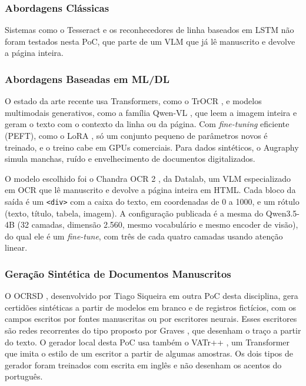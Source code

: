 \subsubsection{Abordagens Clássicas}
Sistemas como o Tesseract e os reconhecedores de linha baseados em LSTM não foram testados nesta PoC, que parte de um VLM que já lê manuscrito e devolve a página inteira.

\subsubsection{Abordagens Baseadas em ML/DL}
O estado da arte recente usa Transformers, como o TrOCR \cite{trocr2021}, e modelos multimodais generativos, como a família Qwen-VL \cite{qwen2vl}, que leem a imagem inteira e geram o texto com o contexto da linha ou da página. Com \emph{fine-tuning} eficiente (PEFT), como o LoRA \cite{lora2022, peft2022}, só um conjunto pequeno de parâmetros novos é treinado, e o treino cabe em GPUs comerciais. Para dados sintéticos, o Augraphy \cite{augraphy2022} simula manchas, ruído e envelhecimento de documentos digitalizados.

O modelo escolhido foi o Chandra OCR 2 \cite{chandra2026}, da Datalab, um VLM especializado em OCR que lê manuscrito e devolve a página inteira em HTML. Cada bloco da saída é um \texttt{<div>} com a caixa do texto, em coordenadas de 0 a 1000, e um rótulo (texto, título, tabela, imagem). A configuração publicada é a mesma do Qwen3.5-4B \cite{qwen35} (32 camadas, dimensão 2.560, mesmo vocabulário e mesmo encoder de visão), do qual ele é um \emph{fine-tune}, com três de cada quatro camadas usando atenção linear.

\subsubsection{Geração Sintética de Documentos Manuscritos}
O OCRSD \cite{ocrsd}, desenvolvido por Tiago Siqueira em outra PoC desta disciplina, gera certidões sintéticas a partir de modelos em branco e de registros fictícios, com os campos escritos por fontes manuscritas ou por escritores neurais. Esses escritores são redes recorrentes do tipo proposto por Graves \cite{graves2013}, que desenham o traço a partir do texto. O gerador local desta PoC usa também o VATr++ \cite{vatrpp2024}, um Transformer que imita o estilo de um escritor a partir de algumas amostras. Os dois tipos de gerador foram treinados com escrita em inglês e não desenham os acentos do português.

